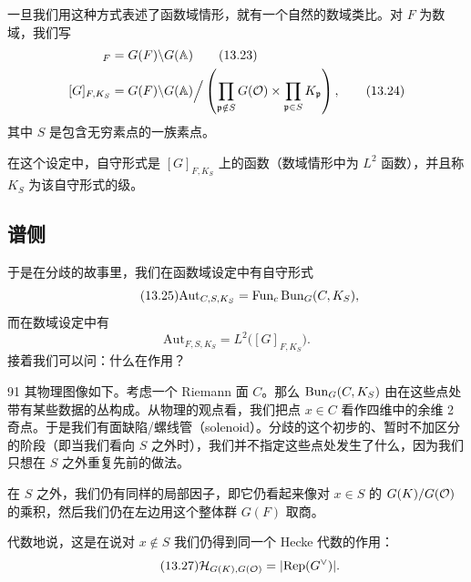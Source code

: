 一旦我们用这种方式表述了函数域情形，就有一个自然的数域类比。对 $F$ 为数域，我们写
\begin{align}
[G]_F&=G(F)\backslash G(\bA) \tag{13.23}\\
[G]_{F,K_S}&=G(F)\backslash G(\bA)\Big/\left(\prod_{\mathfrak p\notin S}G(\cO)\times\prod_{\mathfrak p\in S}K_{\mathfrak p}\right), \tag{13.24}
\end{align}
其中 $S$ 是包含无穷素点的一族素点。

在这个设定中，自守形式是 $[G]_{F,K_S}$ 上的函数（数域情形中为 $L^2$ 函数），并且称 $K_S$ 为该自守形式的级。

\subsection{谱侧}\label{sec:13-3-2}

于是在分歧的故事里，我们在函数域设定中有自守形式
\begin{equation}\tag{13.25}
\mathrm{Aut}_{C,S,K_S}=\mathrm{Fun}_c\,\mathrm{Bun}_G(C,K_S),
\end{equation}
而在数域设定中有
\begin{equation}\tag{13.26}
\mathrm{Aut}_{F,S,K_S}=L^2\bigl([G]_{F,K_S}\bigr).
\end{equation}
接着我们可以问：什么在作用？

\begin{srcrem}{91}
其物理图像如下。考虑一个 Riemann 面 $C$。那么 $\mathrm{Bun}_G(C,K_S)$ 由在这些点处带有某些数据的丛构成。从物理的观点看，我们把点 $x\in C$ 看作四维中的余维 2 奇点。于是我们有面缺陷/螺线管（solenoid）。分歧的这个初步的、暂时不加区分的阶段（即当我们看向 $S$ 之外时），我们并不指定这些点处发生了什么，因为我们只想在 $S$ 之外重复先前的做法。

在 $S$ 之外，我们仍有同样的局部因子，即它仍看起来像对 $x\in S$ 的 $G(K)/G(\mathcal{O})$ 的乘积，然后我们仍在左边用这个整体群 $G(F)$ 取商。
\end{srcrem}

代数地说，这是在说对 $x\notin S$ 我们仍得到同一个 Hecke 代数的作用：
\begin{equation}\tag{13.27}
\mathcal{H}_{G(K),G(\mathcal{O})}=|\mathrm{Rep}(G^\vee)|.
\end{equation}

